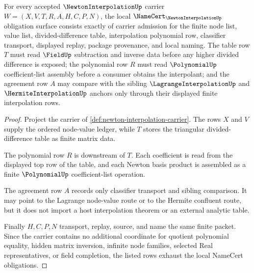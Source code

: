 \begin{theorem}
\label{thm:newton-interpolation-namecert-obligations}
For every accepted $\NewtonInterpolationUp$ carrier $W=(X,V,T,R,A,H,C,P,N)$, the local $\NameCert_{\NewtonInterpolationUp}$ obligation surface consists exactly of carrier admission for the finite node list, value list, divided-difference table, interpolation polynomial row, classifier transport, displayed replay, package provenance, and local naming. The table row $T$ must read $\FieldUp$ subtraction and inverse data before any higher divided difference is exposed; the polynomial row $R$ must read $\PolynomialUp$ coefficient-list assembly before a consumer obtains the interpolant; and the agreement row $A$ may compare with the sibling $\LagrangeInterpolationUp$ and $\HermiteInterpolationUp$ anchors only through their displayed finite interpolation rows.
\end{theorem}
\begin{proof}
Project the carrier of \autoref{def:newton-interpolation-carrier}. The rows $X$ and $V$ supply the ordered node-value ledger, while $T$ stores the triangular divided-difference table as finite matrix data.

The polynomial row $R$ is downstream of $T$. Each coefficient is read from the displayed top row of the table, and each Newton basis product is assembled as a finite $\PolynomialUp$ coefficient-list operation.

The agreement row $A$ records only classifier transport and sibling comparison. It may point to the Lagrange node-value route or to the Hermite confluent route, but it does not import a host interpolation theorem or an external analytic table.

Finally $H,C,P,N$ transport, replay, source, and name the same finite packet. Since the carrier contains no additional coordinate for quotient polynomial equality, hidden matrix inversion, infinite node families, selected Real representatives, or field completion, the listed rows exhaust the local NameCert obligations.
\end{proof}

